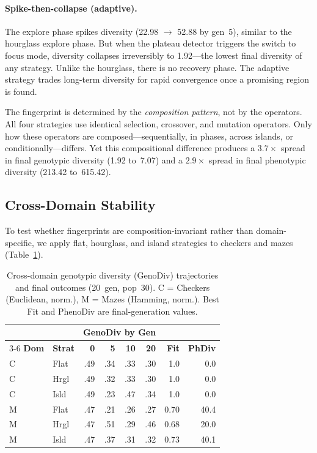 \documentclass[sigconf,anonymous]{acmart}
\begin{document}
\paragraph{Spike-then-collapse (adaptive).}
The explore phase spikes diversity (22.98 $\to$ 52.88 by gen~5), similar to the hourglass explore phase. But when the plateau detector triggers the switch to focus mode, diversity collapses irreversibly to 1.92---the lowest final diversity of any strategy. Unlike the hourglass, there is no recovery phase. The adaptive strategy trades long-term diversity for rapid convergence once a promising region is found.

The fingerprint is determined by the \emph{composition pattern}, not by the operators.
All four strategies use identical selection, crossover, and mutation operators.
Only how these operators are composed---sequentially, in phases, across islands, or conditionally---differs.
Yet this compositional difference produces a $3.7\times$ spread in final genotypic diversity (1.92 to~7.07) and a $2.9\times$ spread in final phenotypic diversity (213.42 to~615.42).


\subsection{Cross-Domain Stability}

To test whether fingerprints are composition-invariant rather than domain-specific, we apply flat, hourglass, and island strategies to checkers and mazes (Table~\ref{tab:cross-domain}).

\begin{table}[ht]
\centering
\caption{Cross-domain genotypic diversity (GenoDiv) trajectories and final outcomes (20~gen, pop~30). C = Checkers (Euclidean, norm.), M = Mazes (Hamming, norm.). Best Fit and PhenoDiv are final-generation values.}
\label{tab:cross-domain}
\begin{tabular}{@{}llrrrrrr@{}}
\toprule
& & \multicolumn{4}{c}{\textbf{GenoDiv by Gen}} & & \\
\cmidrule(lr){3-6}
\textbf{Dom} & \textbf{Strat} & \textbf{0} & \textbf{5} & \textbf{10} & \textbf{20} & \textbf{Fit} & \textbf{PhDiv} \\
\midrule
C & Flat  & .49 & .34 & .33 & .30 & 1.0  & 0.0 \\
C & Hrgl  & .49 & .32 & .33 & .30 & 1.0  & 0.0 \\
C & Isld  & .49 & .23 & .47 & .34 & 1.0  & 0.0 \\
M & Flat  & .47 & .21 & .26 & .27 & 0.70 & 40.4 \\
M & Hrgl  & .47 & .51 & .29 & .46 & 0.68 & 20.0 \\
M & Isld  & .47 & .37 & .31 & .32 & 0.73 & 40.1 \\
\bottomrule
\end{tabular}
\end{table}
\end{document}
